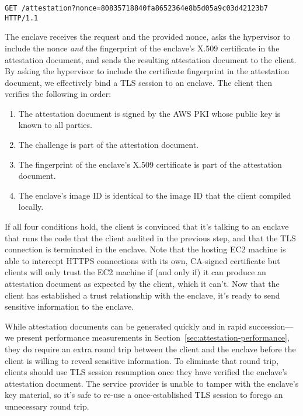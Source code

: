 \begin{lstlisting}
GET /attestation?nonce=80835718840fa8652364e8b5d05a9c03d42123b7 HTTP/1.1
\end{lstlisting}

The enclave receives the request and the provided nonce, asks the hypervisor to
include the nonce \emph{and} the fingerprint of the enclave's X.509 certificate
in the attestation document, and sends the resulting attestation document to
the client.  By asking the hypervisor to include the certificate fingerprint in
the attestation document, we effectively bind a TLS session to an enclave.  The
client then verifies the following in order:

\begin{enumerate}
    \item The attestation document is signed by the AWS PKI whose public key is
      known to all parties.
    \item The challenge is part of the attestation document.
    \item The fingerprint of the enclave's X.509 certificate is part of the
      attestation document.
    \item The enclave's image ID is identical to the image ID that the client
      compiled locally.
\end{enumerate}

If all four conditions hold, the client is convinced that it's talking to an
enclave that runs the code that the client audited in the previous step, and
that the TLS connection is terminated in the enclave.  Note that the hosting
EC2 machine is able to intercept HTTPS connections with its own, CA-signed
certificate but clients will only trust the EC2 machine if (and only if) it can
produce an attestation document as expected by the client, which it can't.  Now
that the client has established a trust relationship with the enclave, it's
ready to send sensitive information to the enclave.

While attestation documents can be generated quickly and in rapid
succession---we present performance measurements in
Section~\ref{sec:attestation-performance}, they do require an extra round trip
between the client and the enclave before the client is willing to reveal
sensitive information.  To eliminate that round trip, clients should use TLS
session resumption once they have verified the enclave's attestation document.
The service provider is unable to tamper with the enclave's key material, so
it's safe to re-use a once-established TLS session to forego an unnecessary
round trip.

